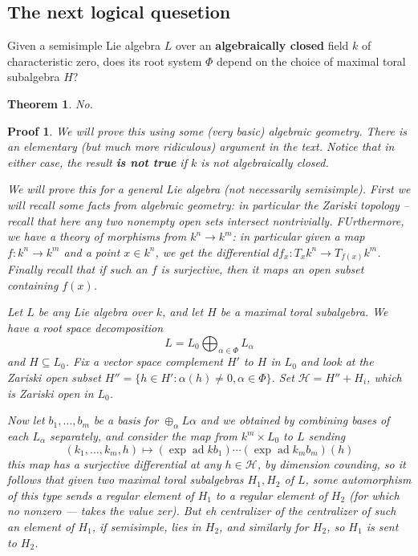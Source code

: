 \documentclass[12pt]{article}
\theoremstyle{nonumberbreak}
\theoremstyle{changebreak}
\newtheorem{thm}{Theorem}[subsection]
\theoremstyle{nonumberbreak}
\newtheorem{prf}{Proof}
\theoremstyle{change}
\DeclareMathOperator{\ad}{ad}
\begin{document}
\subsection{The next logical quesetion}
Given a semisimple Lie algebra $L$ over an \textbf{algebraically closed} field $k$ of characteristic zero,
does its root system $\Phi$ depend on the choice of maximal toral subalgebra $H$?
\begin{thm}
	No.
\end{thm}
\begin{prf}
	We will prove this using some (very basic) algebraic geometry. There is an elementary (but much more ridiculous)
	argument in the text. Notice that in either case, the result \textbf{is not true} if $k$ is not algebraically closed.

	We will prove this for a general Lie algebra (not necessarily semisimple). First we will recall some facts from
	algebraic geometry: in particular the Zariski topology -- recall that here any two nonempty open sets intersect nontrivially.
	FUrthermore, we have a theory of morphisms from $k^n\to k^m$: in particular given a map $f:k^n\to k^m$ and a point $x\in k^n$,
	we get the differential $df_x:T_xk^n\to T_{f(x)}k^m$. Finally recall that if such an $f$ is surjective, then it maps
	an open subset containing $f(x)$.

	Let $L$ be any Lie algebra over $k$, and let $H$ be a maximal toral subalgebra. We have a root space decomposition
	\[L=L_0\bigoplus_{\alpha\in \Phi} L_\alpha\]
	and $H\subseteq L_0$. Fix a vector space complement $H'$ to $H$ in $L_0$ and look at the Zariski open subset $H''=\{h\in H':\alpha(h)\ne 0, \alpha\in\Phi\}$.
	Set $\mathcal H=H''+H_i$, which is Zariski open in $L_0$.

	Now let $b_1,\dots,b_m$ be a basis for $\oplus_\alpha L\alpha$ and we obtained by combining bases of each $L_\alpha$ 
	separately, and consider the map from $k^m\times L_0$  to $L$ sending
	\[(k_1,\dots,k_m,h)\mapsto (\exp\ad k b_1)\cdots(\exp\ad k_m b_m)(h)\]
	this map has a surjective differential at any $h\in\mathcal H$, by dimension counding, so it follows that given two maximal toral subalgebras
	$H_1,H_2$ of $L$, some automorphism of this type sends a regular element of $H_1$ to a regular element of $H_2$
	(for which no nonzero --- takes the value zer). But eh centralizer of the centralizer of such an element of $H_1$, if semisimple,
	lies in $H_2$, and similarly for $H_2$, so $H_1$ is sent to $H_2$.
\end{prf}
\end{document}
